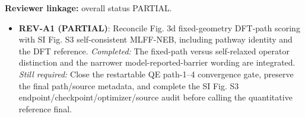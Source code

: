 \textbf{Reviewer linkage:} overall status PARTIAL.
\begin{itemize}[leftmargin=1.4em,noitemsep]
\item \textbf{REV-A1 (PARTIAL)}: Reconcile Fig. 3d fixed-geometry DFT-path scoring with SI Fig. S3 self-consistent MLFF-NEB, including pathway identity and the DFT reference. \emph{Completed:} The fixed-path versus self-relaxed operator distinction and the narrower model-reported-barrier wording are integrated. \emph{Still required:} Close the restartable QE path-1--4 convergence gate, preserve the final path/source metadata, and complete the SI Fig. S3 endpoint/checkpoint/optimizer/source audit before calling the quantitative reference final.
\end{itemize}
